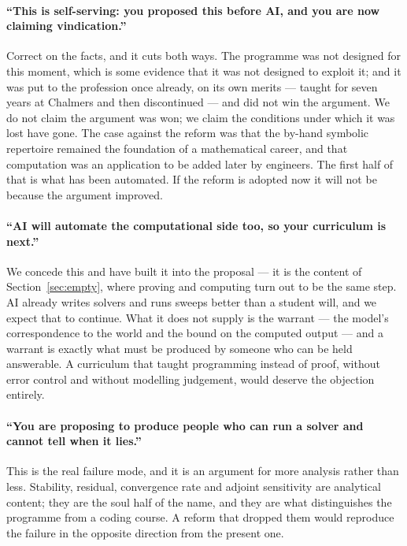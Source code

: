 \documentclass[11pt]{article}
\begin{document}
\paragraph{``This is self-serving: you proposed this before AI, and you are now claiming
vindication.''} Correct on the facts, and it cuts both ways. The programme was not designed for this
moment, which is some evidence that it was not designed to exploit it; and it was put to the
profession once already, on its own merits --- taught for seven years at Chalmers and then
discontinued --- and did not win the argument. We do not claim the
argument was won; we claim the conditions under which it was lost have gone. The case against the
reform was that the by-hand symbolic repertoire remained the foundation of a mathematical career,
and that computation was an application to be added later by engineers. The first half of that is
what has been automated. If the reform is adopted now it will not be because the argument improved.

\paragraph{``AI will automate the computational side too, so your curriculum is next.''} We concede
this and have built it into the proposal --- it is the content of Section~\ref{sec:empty}, where
proving and computing turn out to be the same step. AI already writes solvers and runs sweeps better
than a student will, and we expect that to continue. What it does not supply is the warrant --- the model's correspondence to the world and
the bound on the computed output --- and a warrant is exactly what must be produced by someone who
can be held answerable. A curriculum that taught programming instead of proof, without error control
and without modelling judgement, would deserve the objection entirely.

\paragraph{``You are proposing to produce people who can run a solver and cannot tell when it
lies.''} This is the real failure mode, and it is an argument for more analysis rather than less.
Stability, residual, convergence rate and adjoint sensitivity are analytical content; they are the
soul half of the name, and they are what distinguishes the programme from a coding course. A reform
that dropped them would reproduce the failure in the opposite direction from the present one.
\end{document}
